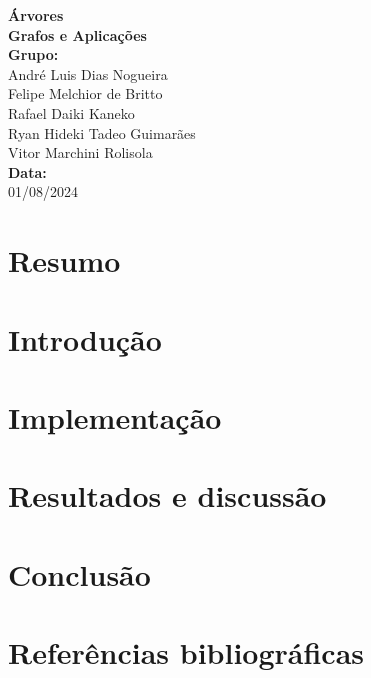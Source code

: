 \documentclass[12pt, a4paper]{scrreprt}
\begin{document}
\begin{titlepage}
    \centering
    \vspace*{2cm}
    \Huge\textbf{Árvores}\\[1.5cm]
    \Large\textbf{Grafos e Aplicações}\\[1.5cm]
    \textbf{Grupo:}\\
    André Luis Dias Nogueira \\
    Felipe Melchior de Britto \\
    Rafael Daiki Kaneko \\
    Ryan Hideki Tadeo Guimarães \\
    Vitor Marchini Rolisola \\[2.5cm]
    \textbf{Data:}\\
    01/08/2024\\
    \vfill
\end{titlepage}

\tableofcontents
\newpage

\chapter{Resumo}

\chapter{Introdução}

\chapter{Implementação}

\chapter{Resultados e discussão}

\chapter{Conclusão}

\chapter{Referências bibliográficas}
\end{document}
